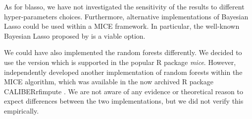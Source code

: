	As for blasso, we have not investigated the sensitivity of the results to different hyper-parameters choices.
	Furthermore, alternative implementations of Bayesian Lasso could be used within a MICE framework.
	In particular, the well-known Bayesian Lasso proposed by \cite{parkCasella:2008} is a viable option.

	We could have also implemented the random forests differently.
	We decided to use the \cite{dooveEtAl:2014} version which is supported in the popular 
	R package \emph{mice}.
	However, \cite{shahEtAl:2014} independently developed another implementation of random forests
	within the MICE algorithm, which was available in the now archived R package CALIBERrfimpute
	\citep{CALIBERrfimpute}.
	We are not aware of any evidence or theoretical reason to expect differences between the two implementations, 
	but we did not verify this empirically.

